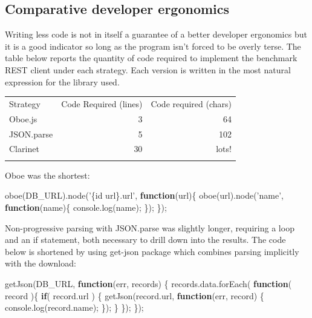\documentclass[12pt, ]{article}
\newenvironment{Shaded}{}{}
\newcommand{\KeywordTok}[1]{\textcolor[rgb]{0.00,0.44,0.13}{\textbf{{#1}}}}
\newcommand{\StringTok}[1]{\textcolor[rgb]{0.25,0.44,0.63}{{#1}}}
\newcommand{\OtherTok}[1]{\textcolor[rgb]{0.00,0.44,0.13}{{#1}}}
\newcommand{\FunctionTok}[1]{\textcolor[rgb]{0.02,0.16,0.49}{{#1}}}
\newcommand{\NormalTok}[1]{{#1}}
\begin{document}
\subsection{Comparative developer
ergonomics}\label{comparative-developer-ergonomics}

Writing less code is not in itself a guarantee of a better developer
ergonomics but it is a good indicator so long as the program isn't
forced to be overly terse. The table below reports the quantity of code
required to implement the benchmark REST client under each strategy.
Each version is written in the most natural expression for the library
used.

\begin{longtable}[c]{@{}lrr@{}}
\hline\noalign{\medskip}
Strategy & Code Required (lines) & Code required (chars)
\\\noalign{\medskip}
\hline\noalign{\medskip}
Oboe.js & 3 & 64
\\\noalign{\medskip}
JSON.parse & 5 & 102
\\\noalign{\medskip}
Clarinet & 30 & lots!
\\\noalign{\medskip}
\hline
\end{longtable}

Oboe was the shortest:

\begin{Shaded}
\begin{Highlighting}[]
\FunctionTok{oboe}\NormalTok{(DB_URL).}\FunctionTok{node}\NormalTok{(}\StringTok{'\{id url\}.url'}\NormalTok{, }\KeywordTok{function}\NormalTok{(url)\{}
   \FunctionTok{oboe}\NormalTok{(url).}\FunctionTok{node}\NormalTok{(}\StringTok{'name'}\NormalTok{, }\KeywordTok{function}\NormalTok{(name)\{}
      \OtherTok{console}\NormalTok{.}\FunctionTok{log}\NormalTok{(name);               }
   \NormalTok{\});      }
\NormalTok{\});}
\end{Highlighting}
\end{Shaded}

Non-progressive parsing with JSON.parse was slightly longer, requiring a
loop and an if statement, both necessary to drill down into the results.
The code below is shortened by using get-json package which combines
parsing implicitly with the download:

\begin{Shaded}
\begin{Highlighting}[]
\FunctionTok{getJson}\NormalTok{(DB_URL, }\KeywordTok{function}\NormalTok{(err, records) \{}
   \OtherTok{records}\NormalTok{.}\OtherTok{data}\NormalTok{.}\FunctionTok{forEach}\NormalTok{( }\KeywordTok{function}\NormalTok{( record )\{}
      \KeywordTok{if}\NormalTok{( }\OtherTok{record}\NormalTok{.}\FunctionTok{url} \NormalTok{) \{}
         \FunctionTok{getJson}\NormalTok{(}\OtherTok{record}\NormalTok{.}\FunctionTok{url}\NormalTok{, }\KeywordTok{function}\NormalTok{(err, record) \{}
            \OtherTok{console}\NormalTok{.}\FunctionTok{log}\NormalTok{(}\OtherTok{record}\NormalTok{.}\FunctionTok{name}\NormalTok{);}
         \NormalTok{\});}
      \NormalTok{\}}
   \NormalTok{\});}
\NormalTok{\});}
\end{Highlighting}
\end{Shaded}
\end{document}
